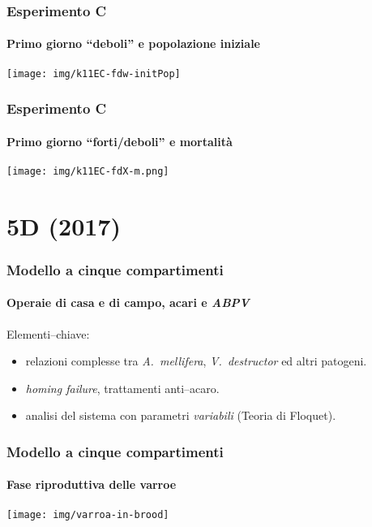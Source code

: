 \documentclass[]{beamer}
\begin{document}
\begin{frame}
    \frametitle{Esperimento C}
    \framesubtitle{Primo giorno ``deboli'' e popolazione iniziale}

    \begin{center}
        \texttt{[image: img/k11EC-fdw-initPop]}
    \end{center}
\end{frame}

\begin{frame}
    \frametitle{Esperimento C}
    \framesubtitle{Primo giorno ``forti/deboli'' e mortalità}

    \begin{center}
        \texttt{[image: img/k11EC-fdX-m.png]}
    \end{center}
\end{frame}


\section{5D (2017)} %


\begin{frame}
    \frametitle{Modello a cinque compartimenti}
    \framesubtitle{Operaie di casa e di campo, acari e \emph{ABPV}}

    \cite{ratti2017}

    \vspace{1em}
    Elementi--chiave:
    \begin{itemize}
        \item \pause relazioni complesse tra \emph{A.~mellifera}, \emph{V.~destructor} ed altri patogeni.
        \item \pause \emph{homing failure}, trattamenti anti--acaro.
        \item \pause analisi del sistema con parametri \emph{variabili} \pause (Teoria di Floquet).
    \end{itemize}
\end{frame}

\begin{frame}
    \frametitle{Modello a cinque compartimenti}
    \framesubtitle{Fase riproduttiva delle varroe}

    \begin{center}
        \texttt{[image: img/varroa-in-brood]}
    \end{center}
\end{frame}
\end{document}
